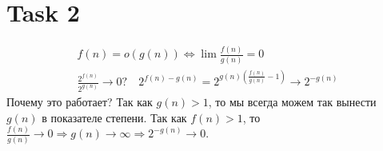\section{Task 2}
\begin{gather}
    f(n) = o(g(n)) \Longleftrightarrow \lim\frac{f(n)}{g(n)} = 0 \\
    \frac{2^{f(n)}}{2^{g(n)}} \to 0?\quad 
    2^{f(n) - g(n)} = 2^{g(n)\left(\frac{f(n)}{g(n)} - 1\right)} \to 2^{-g(n)}
\end{gather}
Почему это работает? Так как $g(n) > 1$, то мы всегда можем так вынести $g(n)$ в показателе степени. Так как $f(n) > 1$, то $\frac{f(n)}{g(n)} \to 0 \Longrightarrow g(n) \to \infty \Longrightarrow 2^{-g(n)} \to 0$.